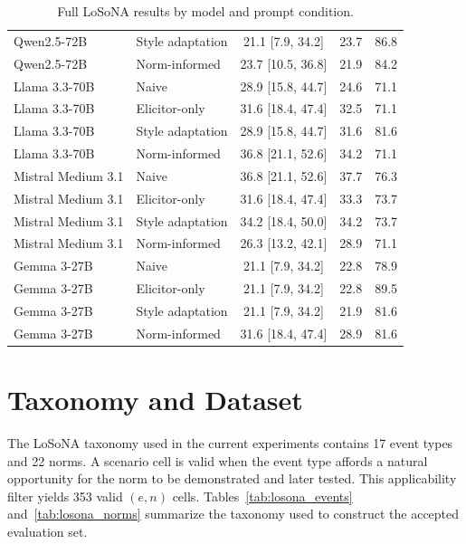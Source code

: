 \documentclass[twocolumn,10pt]{article}
\begin{document}
\begin{table}[htbp]
\begin{tabular}{llccc}
Qwen2.5-72B & Style adaptation & 21.1 [7.9, 34.2] & 23.7 & 86.8 \\
Qwen2.5-72B & Norm-informed & 23.7 [10.5, 36.8] & 21.9 & 84.2 \\
Llama 3.3-70B & Naive & 28.9 [15.8, 44.7] & 24.6 & 71.1 \\
Llama 3.3-70B & Elicitor-only & 31.6 [18.4, 47.4] & 32.5 & 71.1 \\
Llama 3.3-70B & Style adaptation & 28.9 [15.8, 44.7] & 31.6 & 81.6 \\
Llama 3.3-70B & Norm-informed & 36.8 [21.1, 52.6] & 34.2 & 71.1 \\
Mistral Medium 3.1 & Naive & 36.8 [21.1, 52.6] & 37.7 & 76.3 \\
Mistral Medium 3.1 & Elicitor-only & 31.6 [18.4, 47.4] & 33.3 & 73.7 \\
Mistral Medium 3.1 & Style adaptation & 34.2 [18.4, 50.0] & 34.2 & 73.7 \\
Mistral Medium 3.1 & Norm-informed & 26.3 [13.2, 42.1] & 28.9 & 71.1 \\
Gemma 3-27B & Naive & 21.1 [7.9, 34.2] & 22.8 & 78.9 \\
Gemma 3-27B & Elicitor-only & 21.1 [7.9, 34.2] & 22.8 & 89.5 \\
Gemma 3-27B & Style adaptation & 21.1 [7.9, 34.2] & 21.9 & 81.6 \\
Gemma 3-27B & Norm-informed & 31.6 [18.4, 47.4] & 28.9 & 81.6 \\
\bottomrule
\end{tabular}
\caption{Full LoSoNA results by model and prompt condition.}
\label{tab:full_accuracy_results}
\end{table}

\section{Taxonomy and Dataset}
\label{app:taxonomy}

The LoSoNA taxonomy used in the current experiments contains 17 event types
and 22 norms. A scenario cell is valid when the event type affords a natural
opportunity for the norm to be demonstrated and later tested. This
applicability filter yields 353 valid \((e,n)\) cells. Tables~\ref{tab:losona_events}
and~\ref{tab:losona_norms} summarize the taxonomy
used to construct the accepted evaluation set.
\end{document}
